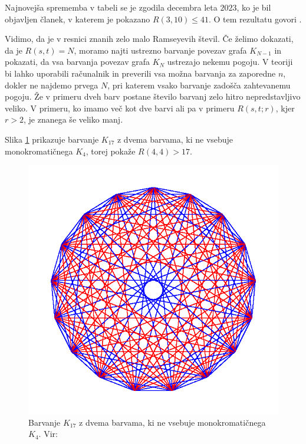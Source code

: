 \documentclass[twoside,11pt]{article}
\begin{document}
Najnovejša sprememba v tabeli se je zgodila decembra leta $2023$, ko je bil objavljen 
članek, v katerem je pokazano $R(3, 10) \le 41$. 
O tem rezultatu govori \cite{r41}.

Vidimo, da je v resnici znanih zelo malo Ramseyevih števil. Če želimo dokazati, 
da je $R(s, t) = N$, moramo najti ustrezno barvanje povezav grafa $K_{N-1}$ in pokazati, da 
vsa barvanja povezav grafa $K_{N}$ ustrezajo nekemu pogoju. V teoriji bi lahko uporabili računalnik 
in preverili vsa možna barvanja za zaporedne $n$, dokler ne najdemo prvega $N$, pri katerem vsako 
barvanje zadošča zahtevanemu pogoju. Že v primeru dveh barv postane število barvanj zelo hitro 
nepredstavljivo veliko. V primeru, ko imamo več kot dve barvi ali pa v primeru $R(s, t; r)$, kjer $r > 2$, je znanega še
veliko manj. 

\begin{primer}
    Slika \ref{fig:r44} prikazuje barvanje $K_{17}$ z dvema barvama, ki ne vsebuje monokromatičnega $K_4$, torej 
    pokaže $R(4, 4) > 17$.
    \begin{figure}[h!]
        \centering
        \includegraphics[scale=0.4]{r44.jpg}
        \caption{Barvanje $K_{17}$ z dvema barvama, ki ne vsebuje monokromatičnega $K_4$. Vir: \cite{r44}}
        \label{fig:r44}
    \end{figure}
\end{primer}
\end{document}
